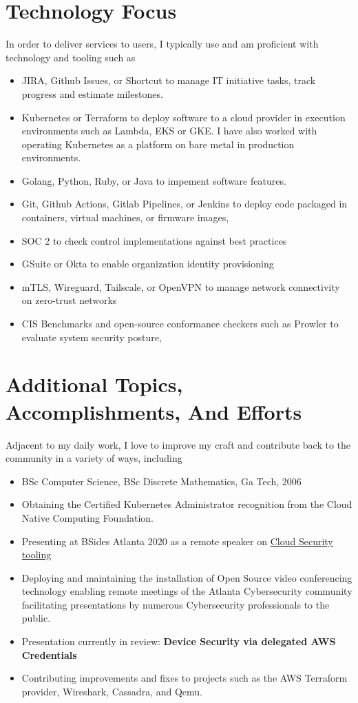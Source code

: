 \documentclass[letterpaper,10pt]{article}
\begin{document}
\section{Technology Focus}
In order to deliver services to users, I typically use and am proficient with technology and tooling such as
\begin{itemize}
	\setlength\itemsep{0.1em}
	\item JIRA, Github Issues, or Shortcut to manage IT initiative tasks, track progress and estimate milestones.
	\item Kubernetes or Terraform to deploy software to a cloud provider in execution environments such as Lambda, EKS or GKE. I have also worked with operating Kubernetes as a platform on bare metal in production environments.
	\item Golang,  Python,  Ruby, or Java to impement software features.
	\item Git, Github Actions, Gitlab Pipelines, or Jenkins to deploy code packaged in containers, virtual machines, or firmware images,
	\item SOC 2 to check control implementations against best practices
	\item GSuite or Okta to enable organization identity provisioning
	\item mTLS, Wireguard, Tailscale, or OpenVPN to manage network connectivity on zero-trust networks
	\item CIS Benchmarks and open-source conformance checkers such as Prowler to evaluate system security posture,
\end{itemize}

\section{Additional Topics, Accomplishments, And Efforts}
Adjacent to my daily work, I love to improve my craft and contribute back to the community in a variety of ways, including
\begin{itemize}
	\setlength\itemsep{0.1em}
	\item BSc Computer Science, BSc Discrete Mathematics, Ga Tech, 2006
	\item Obtaining the Certified Kubernetes Administrator recognition from the Cloud Native Computing Foundation.
	\item Presenting at BSides Atlanta 2020 as a remote speaker on \href{https://www.youtube.com/watch?v=kLCaAaUd1mM}{\color{blue}Cloud Security tooling}
	\item Deploying and maintaining the installation of Open Source video conferencing technology enabling remote meetings of the Atlanta Cybersecurity community facilitating presentations by numerous Cybersecurity professionals to the public.
	\item Presentation currently in review: \textbf{Device Security via delegated AWS Credentials}
	\item Contributing improvements and fixes to projects such as the AWS Terraform provider, Wireshark, Cassadra, and Qemu.
\end{itemize}
\end{document}
